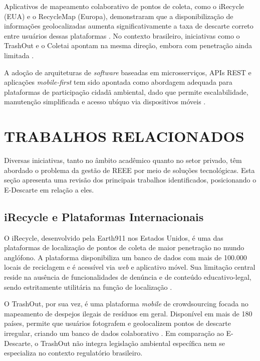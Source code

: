 \documentclass[12pt, a4paper]{article}
\numberwithin{equation}{section}
\numberwithin{figure}{section}
\numberwithin{table}{section}
\begin{document}
Aplicativos de mapeamento colaborativo de pontos de coleta, como o iRecycle
(EUA) e o RecycleMap (Europa), demonstraram que a disponibilização de
informações geolocalizadas aumenta significativamente a taxa de descarte
correto entre usuários dessas plataformas \cite{reno2020}. No contexto
brasileiro, iniciativas como o TrashOut e o Coletai apontam na mesma direção,
embora com penetração ainda limitada \cite{ribeiro2021}.

A adoção de arquiteturas de \textit{software} baseadas em microsserviços,
APIs REST e aplicações \textit{mobile-first} tem sido apontada como abordagem
adequada para plataformas de participação cidadã ambiental, dado que permite
escalabilidade, manutenção simplificada e acesso ubíquo via dispositivos móveis
\cite{fowler2014}.

\section{TRABALHOS RELACIONADOS}

Diversas iniciativas, tanto no âmbito acadêmico quanto no setor privado,
têm abordado o problema da gestão de REEE por meio de soluções tecnológicas.
Esta seção apresenta uma revisão dos principais trabalhos identificados,
posicionando o E-Descarte em relação a eles.

\subsection{iRecycle e Plataformas Internacionais}

O iRecycle, desenvolvido pela Earth911 nos Estados Unidos, é uma das plataformas
de localização de pontos de coleta de maior penetração no mundo anglófono.
A plataforma disponibiliza um banco de dados com mais de 100.000 locais de
reciclagem e é acessível via \textit{web} e aplicativo móvel. Sua limitação
central reside na ausência de funcionalidades de denúncia e de conteúdo
educativo-legal, sendo estritamente utilitária na função de localização
\cite{earth911}.

O TrashOut, por sua vez, é uma plataforma \textit{mobile} de crowdsourcing
focada no mapeamento de despejos ilegais de resíduos em geral. Disponível em
mais de 180 países, permite que usuários fotografem e geolocalizem pontos de
descarte irregular, criando um banco de dados colaborativo \cite{trashout}.
Em comparação ao E-Descarte, o TrashOut não integra legislação ambiental
específica nem se especializa no contexto regulatório brasileiro.
\end{document}
